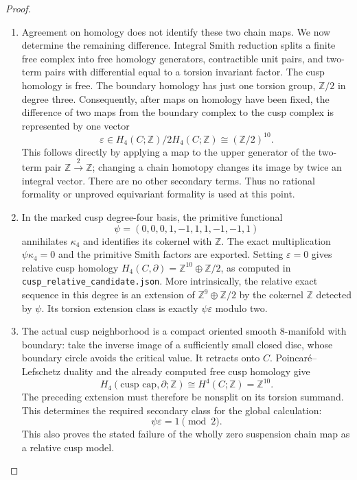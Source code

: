 \documentclass[11pt,a4paper]{article}
\theoremstyle{definition}
\begin{document}
\begin{proof}
\begin{enumerate}[label=\arabic*.]
\item Agreement on homology does not identify these two chain maps.
We now determine the remaining difference.  Integral Smith reduction
splits a finite free complex into free homology generators, contractible
unit pairs, and two-term pairs with differential equal to a torsion
invariant factor.  The cusp homology is free.  The boundary homology
has just one torsion group, $\mathbb Z/2$ in degree three.
Consequently, after maps on homology have been fixed, the difference
of two maps from the boundary complex to the cusp complex is
represented by one vector
\[
 \varepsilon\in H_4(C;\mathbb Z)/2H_4(C;\mathbb Z)
                 \cong(\mathbb Z/2)^{10}.
\tag{1.19.2}
\]
This follows directly by applying a map to the upper generator of
the two-term pair $\mathbb Z\xrightarrow{2}\mathbb Z$; changing a
chain homotopy changes its image by twice an integral vector.
There are no other secondary terms.  Thus no rational formality or
unproved equivariant formality is used at this point.

\item In the marked cusp degree-four basis, the primitive functional
\[
 \psi=(0,0,0,1,-1,1,1,-1,-1,1)
\tag{1.19.3}
\]
annihilates $\kappa_4$ and identifies its cokernel with $\mathbb Z$.
The exact multiplication $\psi\kappa_4=0$ and the primitive Smith
factors are exported.  Setting $\varepsilon=0$ gives relative
cusp homology $H_4(C,\partial)=\mathbb Z^{10}\oplus\mathbb Z/2$,
as computed in \texttt{cusp\_relative\_candidate.json}.
More intrinsically, the relative exact sequence in this degree is
an extension of $\mathbb Z^9\oplus\mathbb Z/2$ by the cokernel
$\mathbb Z$ detected by $\psi$.  Its torsion extension class is
exactly $\psi\varepsilon$ modulo two.

\item The actual cusp neighborhood is a compact oriented smooth
8-manifold with boundary: take the inverse image of a sufficiently
small closed disc, whose boundary circle avoids the critical value.
It retracts onto $C$.  Poincar\'e--Lefschetz duality and the already
computed free cusp homology give
\[
 H_4(\text{cusp cap},\partial;\mathbb Z)
       \cong H^4(C;\mathbb Z)=\mathbb Z^{10}.
\]
The preceding extension must therefore be nonsplit on its torsion
summand.  This determines the required secondary class for the global
calculation:
\[
                 \psi\varepsilon=1\pmod2.
\tag{1.19.4}
\]
This also proves the stated failure of the wholly zero suspension
chain map as a relative cusp model.


\end{enumerate}
\end{proof}
\end{document}

